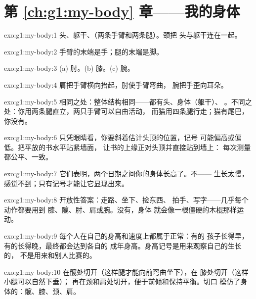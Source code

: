 \section*{第 \ref{ch:g1:my-body} 章——我的身体}

\begin{solution}{exo:g1:my-body:1}
头、躯干、（两条手臂和两条腿）。颈把
头与躯干连在一起。
\end{solution}

\begin{solution}{exo:g1:my-body:2}
手臂的末端是手；腿的末端是脚。
\end{solution}

\begin{solution}{exo:g1:my-body:3}
(a) 肘。(b) 膝。(c) 腕。
\end{solution}

\begin{solution}{exo:g1:my-body:4}
肩把手臂横向抬起，肘使手臂弯曲，
腕把手歪向耳朵。
\end{solution}

\begin{solution}{exo:g1:my-body:5}
相同之处：整体结构相同——都有头、身体（躯干）、
。不同之处：你用两条腿直立，两只手臂可以自由活动，
而猫用四条腿行走；猫有尾巴，
你没有。
\end{solution}

\begin{solution}{exo:g1:my-body:6}
只凭眼睛看，你要斜着估计头顶的位置，记号
可能偏高或偏低。把平放的书水平贴紧墙面，
让书的上缘正对头顶并直接贴到墙上：
每次测量都公平、一致。
\end{solution}

\begin{solution}{exo:g1:my-body:7}
它们表明，两个日期之间你的身体长高了。不——
生长太慢，感觉不到；只有记号才能让它显现出来。
\end{solution}

\begin{solution}{exo:g1:my-body:8}
开放性答案：走路、坐下、捡东西、
拍手、写字——几乎每个动作都要用到
膝、髋、肘、肩或腕。没有，身体
就会像一根僵硬的木棍那样运动。
\end{solution}

\begin{solution}{exo:g1:my-body:9}
每个人在自己的身高和速度上都属于正常：有的
孩子长得早，有的长得晚，最终都会达到各自的
成年身高。身高记号是用来观察自己的生长的，
不是用来和别人比赛的。
\end{solution}

\begin{solution}{exo:g1:my-body:10}
在髋处切开（这样腿才能向前弯曲坐下），在
膝处切开（这样小腿可以自然下垂）；
再在颈和肩处切开，便于前倾和保持平衡。切口
模仿了身体的：髋、膝、颈、肩。
\end{solution}
